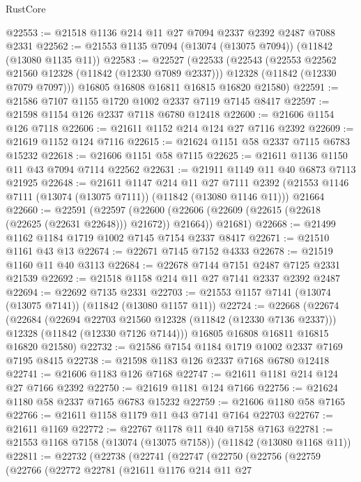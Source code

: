 \begin{lexlean}{RustCore}
\begin{coremodule}
@22553 := @21518 @1136 @214 @11 @27 @7094 @2337 @2392 @2487 @7088 @2331
@22562 := @21553 @1135 @7094 (@13074 (@13075 @7094)) (@11842 (@13080 @1135 @11))
@22583 := @22527
    (@22533
      (@22543
        (@22553 @22562 @21560 @12328 (@11842 (@12330 @7089 @2337)))
        @12328
        (@11842 (@12330 @7079 @7097)))
      @16805
      @16808
      @16811
      @16815
      @16820
      @21580)
@22591 := @21586 @7107 @1155 @1720 @1002 @2337 @7119 @7145 @8417
@22597 := @21598 @1154 @126 @2337 @7118 @6780 @12418
@22600 := @21606 @1154 @126 @7118
@22606 := @21611 @1152 @214 @124 @27 @7116 @2392
@22609 := @21619 @1152 @124 @7116
@22615 := @21624 @1151 @58 @2337 @7115 @6783 @15232
@22618 := @21606 @1151 @58 @7115
@22625 := @21611 @1136 @1150 @11 @43 @7094 @7114 @22562
@22631 := @21911 @1149 @11 @40 @6873 @7113 @21925
@22648 := @21611
    @1147
    @214
    @11
    @27
    @7111
    @2392
    (@21553 @1146 @7111 (@13074 (@13075 @7111)) (@11842 (@13080 @1146 @11)))
    @21664
@22660 := @22591
    (@22597
      (@22600 (@22606 (@22609 (@22615 (@22618 (@22625 (@22631 @22648))) @21672)) @21664))
      @21681)
@22668 := @21499 @1162 @1184 @1719 @1002 @7145 @7154 @2337 @8417
@22671 := @21510 @1161 @43 @13
@22674 := @22671 @7145 @7152 @4333
@22678 := @21519 @1160 @11 @40 @3113
@22684 := @22678 @7144 @7151 @2487 @7125 @2331 @21539
@22692 := @21518 @1158 @214 @11 @27 @7141 @2337 @2392 @2487
@22694 := @22692 @7135 @2331
@22703 := @21553 @1157 @7141 (@13074 (@13075 @7141)) (@11842 (@13080 @1157 @11))
@22724 := @22668
    (@22674
      (@22684
        (@22694 @22703 @21560 @12328 (@11842 (@12330 @7136 @2337)))
        @12328
        (@11842 (@12330 @7126 @7144)))
      @16805
      @16808
      @16811
      @16815
      @16820
      @21580)
@22732 := @21586 @7154 @1184 @1719 @1002 @2337 @7169 @7195 @8415
@22738 := @21598 @1183 @126 @2337 @7168 @6780 @12418
@22741 := @21606 @1183 @126 @7168
@22747 := @21611 @1181 @214 @124 @27 @7166 @2392
@22750 := @21619 @1181 @124 @7166
@22756 := @21624 @1180 @58 @2337 @7165 @6783 @15232
@22759 := @21606 @1180 @58 @7165
@22766 := @21611 @1158 @1179 @11 @43 @7141 @7164 @22703
@22767 := @21611 @1169
@22772 := @22767 @1178 @11 @40 @7158 @7163
@22781 := @21553 @1168 @7158 (@13074 (@13075 @7158)) (@11842 (@13080 @1168 @11))
@22811 := @22732
    (@22738
      (@22741
        (@22747
          (@22750
            (@22756
              (@22759
                (@22766
                  (@22772
                    @22781
                    (@21611
                      @1176
                      @214
                      @11
                      @27

\end{coremodule}
\end{lexlean}
